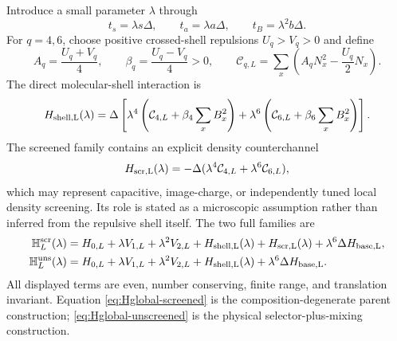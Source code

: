 \documentclass[11pt]{article}
\theoremstyle{definition}
\theoremstyle{remark}
\newcommand{\cC}{\mathcal C}
\begin{document}
Introduce a small parameter $\lambda$ through
\begin{equation}
 t_s=\lambda s\Delta,
 \qquad t_a=\lambda a\Delta,
 \qquad t_B=\lambda^2b\Delta.
 \label{eq:hierarchy}
\end{equation}
For $q=4,6$, choose positive crossed-shell repulsions $U_q>V_q>0$ and define
\begin{equation}
 A_q=\frac{U_q+V_q}{4},
 \qquad
 \beta_q=\frac{U_q-V_q}{4}>0,
 \qquad
 \cC_{q,L}=\sum_x\left(A_qN_x^2-\frac{U_q}{2}N_x\right).
 \label{eq:shell-coefficients}
\end{equation}
The direct molecular-shell interaction is
\begin{equation}
 H_{\rm shell,L}(\lambda)=\Delta\left[
 \lambda^4\left(\cC_{4,L}+\beta_4\sum_xB_x^2\right)
 +\lambda^6\left(\cC_{6,L}+\beta_6\sum_xB_x^2\right)
 \right].
 \label{eq:Hshell}
\end{equation}
The screened family contains an explicit density counterchannel
\begin{equation}
 H_{\rm scr,L}(\lambda)=-\Delta(\lambda^4\cC_{4,L}+\lambda^6\cC_{6,L}),
 \label{eq:Hscreen}
\end{equation}
which may represent capacitive, image-charge, or independently tuned local density screening.  Its role is stated as a microscopic assumption rather than inferred from the repulsive shell itself.  The two full families are
\begin{align}
 \mathbb H_L^{\rm scr}(\lambda)={}&H_{0,L}+\lambda V_{1,L}+\lambda^2V_{2,L}
 +H_{\rm shell,L}(\lambda)+H_{\rm scr,L}(\lambda)
 +\lambda^6\Delta H_{\rm base,L},
 \label{eq:Hglobal-screened}\\
 \mathbb H_L^{\rm uns}(\lambda)={}&H_{0,L}+\lambda V_{1,L}+\lambda^2V_{2,L}
 +H_{\rm shell,L}(\lambda)+\lambda^6\Delta H_{\rm base,L}.
 \label{eq:Hglobal-unscreened}
\end{align}
All displayed terms are even, number conserving, finite range, and translation invariant.  Equation \eqref{eq:Hglobal-screened} is the composition-degenerate parent construction; \eqref{eq:Hglobal-unscreened} is the physical selector-plus-mixing construction.
\end{document}

